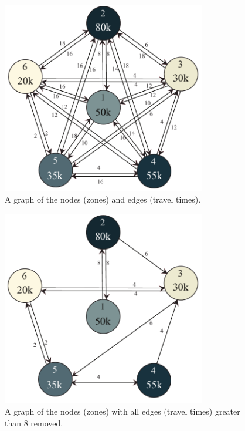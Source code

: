 \documentclass[notitlepage, 12pt]{article}
\begin{document}
\newpage

\begin{figure}[htbp]
\begin{center}
\includegraphics[width=3.5in]{6point.pdf}
\caption{A graph of the nodes (zones) and edges (travel times).}
\label{satan1}
\end{center}
\end{figure}

\begin{figure}[htbp]
\begin{center}
\includegraphics[width=3.5in]{greedy6point.pdf}
\caption{A graph of the nodes (zones) with all edges (travel times) greater than 8 removed.}
\label{satan2}
\end{center}
\end{figure}

\end{document}
